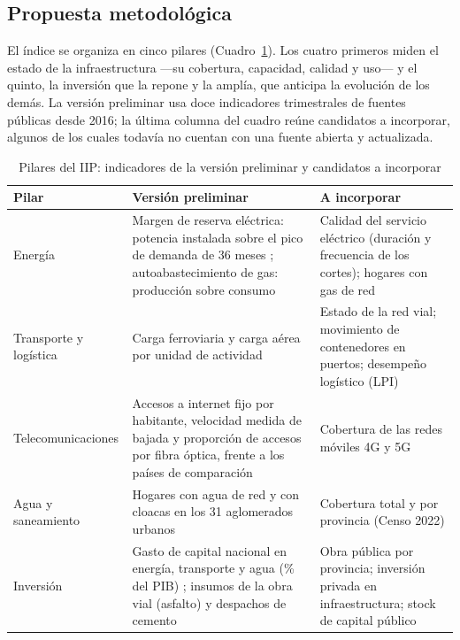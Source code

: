 \subsection{Propuesta metodológica}

El índice se organiza en cinco pilares (Cuadro~\ref{tab:iip_pilares}). Los cuatro primeros miden el estado de la infraestructura ---su cobertura, capacidad, calidad y uso--- y el quinto, la inversión que la repone y la amplía, que anticipa la evolución de los demás. La versión preliminar usa doce indicadores trimestrales de fuentes públicas desde 2016; la última columna del cuadro reúne candidatos a incorporar, algunos de los cuales todavía no cuentan con una fuente abierta y actualizada.

\begin{table}[!htb]
\centering
\small
\caption{Pilares del IIP: indicadores de la versión preliminar y candidatos a incorporar}
\vspace{.25 cm}
\label{tab:iip_pilares}
\begin{tabular}{@{}p{3.0cm}p{6.3cm}p{5.8cm}@{}}
\toprule
\textbf{Pilar} & \textbf{Versión preliminar} & \textbf{A incorporar} \\
\midrule
Energía & Margen de reserva eléctrica: potencia instalada sobre el pico de demanda de 36 meses \cite{cammesa}; autoabastecimiento de gas: producción sobre consumo \cite{se_gas} & Calidad del servicio eléctrico (duración y frecuencia de los cortes); hogares con gas de red \\
Transporte y logística & Carga ferroviaria y carga aérea por unidad de actividad \cite{indec_issp} & Estado de la red vial; movimiento de contenedores en puertos; desempeño logístico (LPI) \\
Telecomunicaciones & Accesos a internet fijo por habitante, velocidad medida de bajada y proporción de accesos por fibra óptica, frente a los países de comparación \cite{enacom_internet,ookla,bm_wdi,ocde_broadband} & Cobertura de las redes móviles 4G y 5G \\
Agua y saneamiento & Hogares con agua de red y con cloacas en los 31 aglomerados urbanos \cite{indec_eph} & Cobertura total y por provincia (Censo 2022) \\
Inversión & Gasto de capital nacional en energía, transporte y agua (\% del PIB) \cite{mecon_imig}; insumos de la obra vial (asfalto) y despachos de cemento \cite{indec_isac} & Obra pública por provincia; inversión privada en infraestructura; stock de capital público \\
\bottomrule
\end{tabular}
\end{table}

